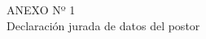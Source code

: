 \begin{center}
    \vspace*{\fill} %
    \Huge %
    ANEXO Nº 1 \\
    Declaración jurada de datos del postor
    \vspace*{\fill} %
\end{center}